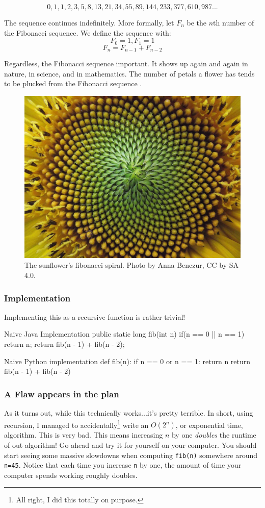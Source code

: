 $$0, 1, 1, 2, 3, 5, 8, 13, 21, 34, 55, 89, 144, 233, 377, 610, 987...$$

The sequence continues indefinitely. More formally, let $F_n$ be the $n$th number of the Fibonacci sequence. We define the sequence with:
$$ F_{0} = 1, F_{1} = 1$$
$$ F_n = F_{n-1} + F_{n-2}$$


Regardless, the Fibonacci sequence important.  It shows up again and again in nature, in science, and in mathematics.  The number of petals a flower has tends to be plucked from the Fibonacci sequence \cite{turner2020flowers}.

\begin{figure}
	\centering
	\includegraphics[width=0.7\linewidth]{pics/sunflower}
	\caption{The sunflower's fibonacci spiral. Photo by Anna Benczur, CC by-SA 4.0.}
	\label{fig:sunflower}
\end{figure}




\subsubsection{Implementation}
Implementing this as a recursive function is rather trivial!

\begin{javacode}{Naive Java Implementation}
public static long fib(int n){
	if(n == 0 || n == 1) {
		return n;
	}
	return fib(n - 1) + fib(n - 2);
}
\end{javacode}

\begin{pycode}{Naive Python implementation}
def fib(n):
	if n == 0 or n == 1:
		return n
	return fib(n - 1) + fib(n - 2)
\end{pycode}

\subsubsection{A Flaw appears in the plan}
As it turns out, while this technically works...it's pretty terrible.  In short, using recursion, I managed to accidentally\footnote{All right, I did this totally on purpose.} write an $ O(2^n) $, or exponential time, algorithm. This is very bad.  This means increasing $ n $ by one \emph{doubles} the runtime of out algorithm! Go ahead and try it for yourself on your computer.  You should start seeing some massive slowdowns when computing \texttt{fib(n)} somewhere around \texttt{n=45}.  Notice that each time you increase \texttt{n} by one, the amount of time your computer spends working roughly doubles.

